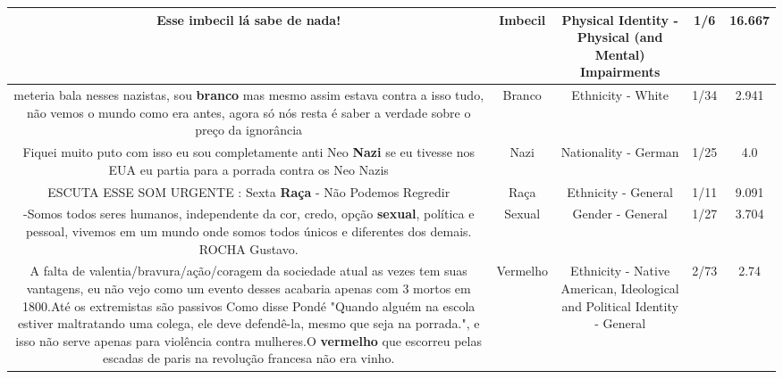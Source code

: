 \documentclass[11pt]{article}
\newlength\mylength
\begin{document}
\begin{center}
\begin{longtable}{|C{.65\mylength}|C{.30\mylength}|C{.12\mylength}|C{.12\mylength}|C{.12\mylength}|}
  \small Esse \textbf{imbecil} lá sabe de nada!\normalsize   & Imbecil & Physical Identity - Physical (and Mental) Impairments & 1/6 & 16.667 \\  \hline
  \small meteria bala nesses nazistas, sou \textbf{branco} mas mesmo assim estava contra a isso tudo, não vemos o mundo como era antes, agora só nós resta é saber a verdade sobre o preço da ignorância\normalsize   & Branco & Ethnicity - White & 1/34 & 2.941 \\  \hline
  \small Fiquei muito puto com isso eu sou completamente anti Neo \textbf{Nazi} se eu tivesse nos EUA eu partia para a porrada contra os Neo Nazis\normalsize   & Nazi & Nationality - German & 1/25 & 4.0 \\  \hline
  \small ESCUTA ESSE SOM URGENTE : Sexta \textbf{Raça} - Não Podemos Regredir\normalsize   & Raça & Ethnicity - General & 1/11 & 9.091 \\  \hline
  \small -Somos todos seres humanos, independente da cor, credo, opção \textbf{sexual}, política e pessoal, vivemos em um mundo onde somos todos únicos e diferentes dos demais. ROCHA Gustavo.\normalsize   & Sexual & Gender - General & 1/27 & 3.704 \\  \hline
  \small A falta de valentia/bravura/ação/coragem da sociedade atual as vezes tem suas vantagens, eu não vejo como um evento desses acabaria apenas com 3 mortos em 1800.Até os extremistas são passivos Como disse Pondé "Quando alguém na escola estiver maltratando uma colega, ele deve defendê-la, mesmo que seja na porrada.", e isso não serve apenas para violência contra mulheres.O \textbf{v\textbf{ermelho}} que escorreu pelas escadas de paris na revolução francesa não era vinho.\normalsize   & Vermelho & Ethnicity - Native American, Ideological and Political Identity - General & 2/73 & 2.74 \\  \hline

\end{longtable}
\end{center}
\end{document}
